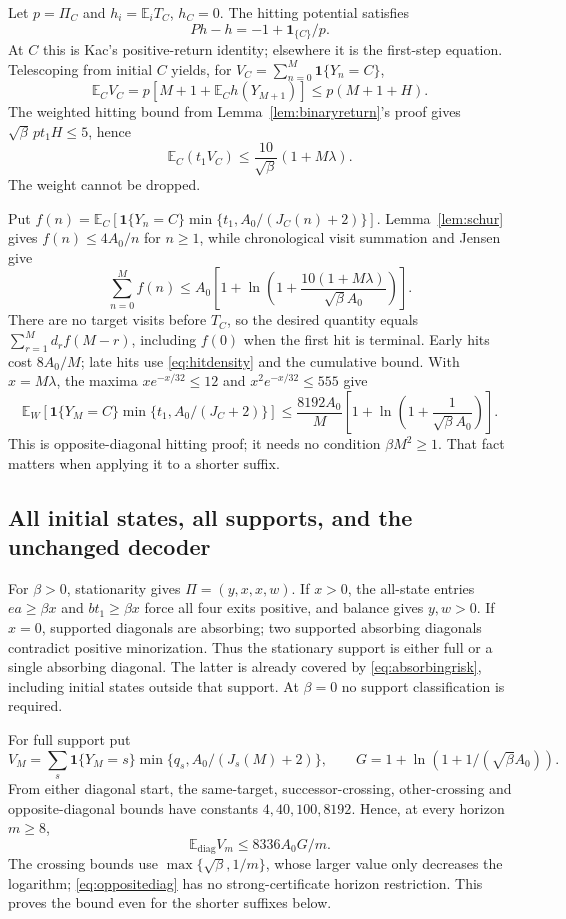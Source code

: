 \documentclass[11pt,letterpaper]{article}
\theoremstyle{definition}\newtheorem{definition}[theorem]{Definition}
\theoremstyle{remark}\newtheorem{remark}[theorem]{Remark}
\newcommand{\E}{\mathbb{E}}
\newcommand{\ind}{\mathbf{1}}
\begin{document}
Let $p=\Pi_C$ and $h_i=\E_iT_C$, $h_C=0$. The hitting potential satisfies
\[
 Ph-h=-1+\ind_{\{C\}}/p.
\]
At $C$ this is Kac's positive-return identity; elsewhere it is the first-step equation. Telescoping from initial $C$ yields, for $V_C=\sum_{n=0}^M\ind\{Y_n=C\}$,
\[
 \E_CV_C=p[M+1+\E_Ch(Y_{M+1})]\le p(M+1+H).
\]
The weighted hitting bound from Lemma~\ref{lem:binaryreturn}'s proof gives
$\sqrt\beta\,pt_1H\le5$, hence
\[
 \E_C(t_1V_C)\le\frac{10}{\sqrt\beta}(1+M\lambda).
\]
The weight cannot be dropped.

Put $f(n)=\E_C[\ind\{Y_n=C\}\min\{t_1,A_0/(J_C(n)+2)\}]$.
Lemma~\ref{lem:schur} gives $f(n)\le4A_0/n$ for $n\ge1$, while chronological visit summation and Jensen give
\[
 \sum_{n=0}^Mf(n)
 \le A_0\left[1+\ln\left(1+
 \frac{10(1+M\lambda)}{\sqrt\beta A_0}\right)\right].
\]
There are no target visits before $T_C$, so the desired quantity equals
$\sum_{r=1}^Md_rf(M-r)$, including $f(0)$ when the first hit is terminal.
Early hits cost $8A_0/M$; late hits use \eqref{eq:hitdensity} and the cumulative bound. With $x=M\lambda$, the maxima
$x e^{-x/32}\le12$ and $x^2e^{-x/32}\le555$
give
\begin{equation}\label{eq:oppositediag}
 \E_W[\ind\{Y_M=C\}\min\{t_1,A_0/(J_C+2)\}]
 \le\frac{8192A_0}{M}
 \left[1+\ln\left(1+\frac1{\sqrt\beta A_0}\right)\right].
\end{equation}
This is opposite-diagonal hitting proof; it needs no condition $\beta M^2\ge1$. That fact matters when applying it to a shorter suffix.


\subsection{All initial states, all supports, and the unchanged decoder}
For $\beta>0$, stationarity gives $\Pi=(y,x,x,w)$.
If $x>0$, the all-state entries $ea\ge\beta x$ and $bt_1\ge\beta x$ force all four exits positive, and balance gives $y,w>0$. If $x=0$, supported diagonals are absorbing; two supported absorbing diagonals contradict positive minorization. Thus the stationary support is either full or a single absorbing diagonal. The latter is already covered by \eqref{eq:absorbingrisk}, including initial states outside that support. At $\beta=0$ no support classification is required.

For full support put
\[
 V_M=\sum_s\ind\{Y_M=s\}\min\{q_s,A_0/(J_s(M)+2)\},
 \qquad G=1+\ln(1+1/(\sqrt\beta A_0)).
\]
From either diagonal start, the same-target, successor-crossing, other-crossing and opposite-diagonal bounds have constants $4,40,100,8192$. Hence, at every horizon $m\ge8$,
\[
 \E_{\mathrm{diag}}V_m\le8336 A_0G/m.
\]
The crossing bounds use $\max\{\sqrt\beta,1/m\}$, whose larger value only decreases the logarithm; \eqref{eq:oppositediag} has no strong-certificate horizon restriction. This proves the bound even for the shorter suffixes below.
\end{document}
